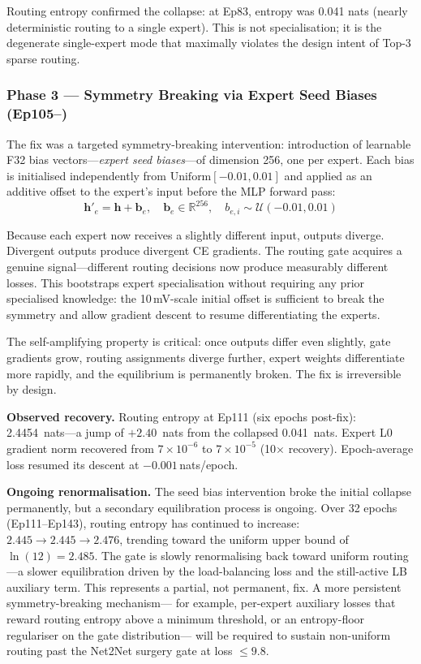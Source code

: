 \documentclass[11pt,a4paper]{article}
\begin{document}
Routing entropy confirmed the collapse: at Ep83, entropy was 0.041 nats
(nearly deterministic routing to a single expert). This is not specialisation; it
is the degenerate single-expert mode that maximally violates the design intent of
Top-3 sparse routing.

\subsubsection{Phase 3 --- Symmetry Breaking via Expert Seed Biases (Ep105--)}

The fix was a targeted symmetry-breaking intervention: introduction of learnable
F32 bias vectors---\emph{expert seed biases}---of dimension 256, one per expert.
Each bias is initialised independently from $\text{Uniform}[-0.01, 0.01]$ and
applied as an additive offset to the expert's input before the MLP forward pass:
\begin{equation}
  \mathbf{h}'_e = \mathbf{h} + \mathbf{b}_e, \quad \mathbf{b}_e \in \mathbb{R}^{256},
  \quad b_{e,i} \sim \mathcal{U}(-0.01, 0.01)
  \label{eq:seed_bias}
\end{equation}

Because each expert now receives a slightly different input, outputs diverge.
Divergent outputs produce divergent CE gradients. The routing gate acquires a
genuine signal---different routing decisions now produce measurably different
losses. This bootstraps expert specialisation without requiring any prior
specialised knowledge: the 10\,mV-scale initial offset is sufficient to break the
symmetry and allow gradient descent to resume differentiating the experts.

The self-amplifying property is critical: once outputs differ even slightly, gate
gradients grow, routing assignments diverge further, expert weights differentiate
more rapidly, and the equilibrium is permanently broken. The fix is irreversible
by design.

\textbf{Observed recovery.} Routing entropy at Ep111 (six epochs post-fix):
2.4454~nats---a jump of $+2.40$~nats from the collapsed 0.041~nats. Expert
L0 gradient norm recovered from $7\!\times\!10^{-6}$ to $7\!\times\!10^{-5}$
(10$\times$ recovery). Epoch-average loss resumed its descent at $-0.001$\,nats/epoch.

\textbf{Ongoing renormalisation.}
The seed bias intervention broke the initial collapse permanently, but a
secondary equilibration process is ongoing. Over 32 epochs (Ep111--Ep143),
routing entropy has continued to increase: $2.445 \to 2.445 \to 2.476$, trending
toward the uniform upper bound of $\ln(12) = 2.485$. The gate is slowly
renormalising back toward uniform routing---a slower equilibration driven by
the load-balancing loss and the still-active LB auxiliary term. This represents
a partial, not permanent, fix. A more persistent symmetry-breaking mechanism---
for example, per-expert auxiliary losses that reward routing entropy above a
minimum threshold, or an entropy-floor regulariser on the gate distribution---
will be required to sustain non-uniform routing past the Net2Net surgery gate at
loss $\leq 9.8$.
\end{document}
